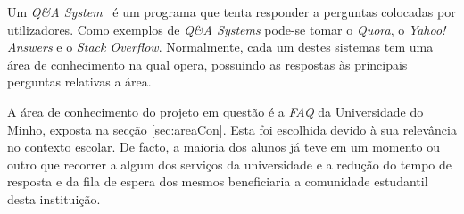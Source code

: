 \quad Um \textit{Q\&A System}~\cite{QA} é um programa que tenta responder a perguntas colocadas por utilizadores. Como exemplos de \textit{Q\&A Systems}  pode-se tomar o \textit{Quora}, o \textit{Yahoo! Answers} e o \textit{Stack Overflow}. Normalmente, cada um destes sistemas tem uma área de conhecimento na qual opera, possuindo as respostas às principais perguntas relativas a área. 

A área de conhecimento do projeto em questão é a \textit{FAQ} da Universidade do Minho, exposta na secção \ref{sec:areaCon}. Esta foi escolhida devido à sua relevância no contexto escolar. De facto, a maioria dos alunos já teve em um momento ou outro que recorrer a algum dos serviços da universidade e a redução do tempo de resposta e da fila de espera dos mesmos beneficiaria a comunidade estudantil desta instituição.

